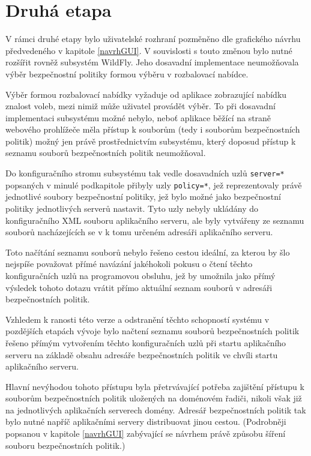 \section{Druhá etapa}

V rámci druhé etapy bylo uživatelské rozhraní pozměněno dle grafického návrhu předvedeného v kapitole \ref{navrhGUI}. V souvislosti s touto změnou bylo nutné rozšířit rovněž subsystém WildFly. Jeho dosavadní implementace neumožňovala výběr bezpečnostní politiky formou výběru v rozbalovací nabídce.

Výběr formou rozbalovací nabídky vyžaduje od aplikace zobrazující nabídku znalost voleb, mezi nimiž může uživatel provádět výběr. To při dosavadní implementaci subsystému možné nebylo, neboť aplikace běžící na straně webového prohlížeče měla přístup k souborům (tedy i souborům bezpečnostních politik) možný jen právě prostřednictvím subsystému, který doposud přístup k seznamu souborů bezpečnostních politik neumožňoval.

Do konfiguračního stromu subsystému tak vedle dosavadních uzlů {\tt server=*} popsaných v minulé podkapitole přibyly uzly {\tt policy=*}, jež reprezentovaly právě jednotlivé soubory bezpečnostní politiky, jež bylo možné jako bezpečnostní politiky jednotlivých serverů nastavit. Tyto uzly nebyly ukládány do konfiguračního XML souboru aplikačního serveru, ale byly vytvářeny ze seznamu souborů nacházejících se v k tomu určeném adresáři aplikačního serveru.

Toto načítání seznamu souborů nebylo řešeno cestou ideální, za kterou by šlo nejspíše považovat přímé navázání jakéhokoli pokusu o čtení těchto konfiguračních uzlů na programovou obsluhu, jež by umožnila jako přímý výsledek tohoto dotazu vrátit přímo aktuální seznam souborů v adresáři bezpečnostních politik.

Vzhledem k ranosti této verze a odstranění těchto schopností systému v pozdějších etapách vývoje bylo načtení seznamu souborů bezpečnostních politik řešeno přímým vytvořením těchto konfiguračních uzlů při startu aplikačního serveru na základě obsahu adresáře bezpečnostních politik ve chvíli startu aplikačního serveru.

Hlavní nevýhodou tohoto přístupu byla přetrvávající potřeba zajištění přístupu k souborům bezpečnostních politik uložených na doménovém řadiči, nikoli však již na jednotlivých aplikačních serverech domény. Adresář bezpečnostních politik tak bylo nutné napříč aplikačními servery distribuovat jinou cestou. (Podrobněji popsanou v kapitole \ref{navrhGUI} zabývající se návrhem právě způsobu šíření souboru bezpečnostních politik.)


